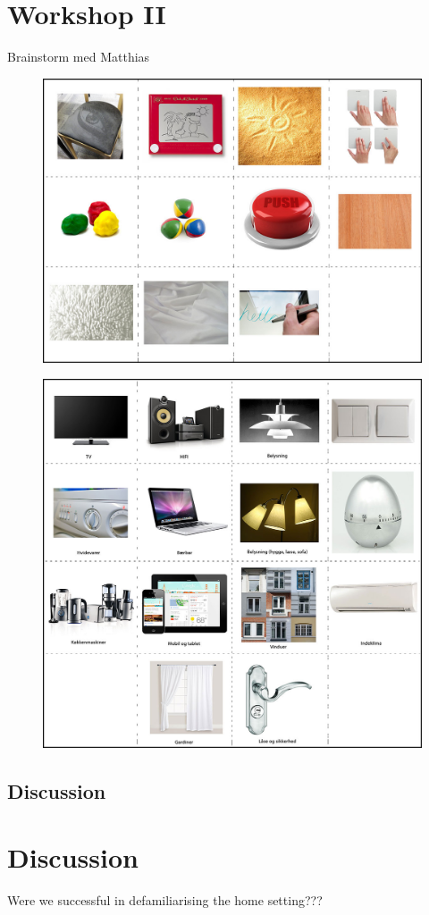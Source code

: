 \section{Workshop II}
Brainstorm med Matthias


\begin{figure}
\centering
\begin{minipage}[t]{.5\textwidth}
  \centering
  \includegraphics[width=0.9\linewidth]{workshops/technology-cards}
  \label{ch:workshops:technology-cards}
\end{minipage}%
\begin{minipage}[t]{.5\textwidth}
  \centering
  \includegraphics[width=0.9\linewidth]{workshops/appliance-cards}
  \label{ch:workshops:appliance-cards}
\end{minipage}
\end{figure}

\subsection{Discussion}


\section{Discussion}

 Were we successful in defamiliarising the home setting???

